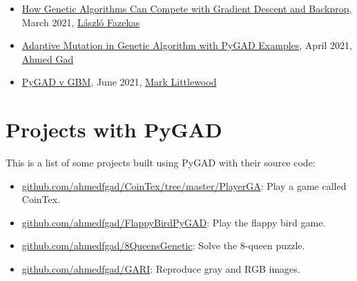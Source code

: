 \documentclass[conference]{IEEEtran}
\begin{document}
\begin{appendices}
\begin{itemize}
    \item \href{https://hackernoon.com/how-genetic-algorithms-can-compete-with-gradient-descent-and-backprop-9m9t33bq}{How Genetic Algorithms Can Compete with Gradient Descent and Backprop}, March 2021, \href{https://www.linkedin.com/in/l\%C3\%A1szl\%C3\%B3-fazekas-2429a912}{László Fazekas}
    \item \href{https://neptune.ai/blog/adaptive-mutation-in-genetic-algorithm-with-python-examples}{Adaptive Mutation in Genetic Algorithm with PyGAD Examples}, April 2021, \href{https://www.linkedin.com/in/ahmedfgad}{Ahmed Gad}
    \item \href{https://markatsmartersig.wordpress.com/2021/06/05/pygad-v-gbm}{PyGAD v GBM}, June 2021, \href{http://www.smartersig.com/mysportsai.php}{Mark Littlewood}
\end{itemize}

\section{Projects with PyGAD}
\label{AppendixB}

This is a list of some projects built using PyGAD with their source code:

\begin{itemize}
    \item \href{https://github.com/ahmedfgad/CoinTex/tree/master/PlayerGA}{github.com/ahmedfgad/CoinTex/tree/master/PlayerGA}: Play a game called CoinTex.
    \item \href{https://github.com/ahmedfgad/FlappyBirdPyGAD}{github.com/ahmedfgad/FlappyBirdPyGAD}: Play the flappy bird game.
    \item \href{https://github.com/ahmedfgad/8QueensGenetic}{github.com/ahmedfgad/8QueensGenetic}: Solve the 8-queen puzzle.
    \item \href{https://github.com/ahmedfgad/GARI}{github.com/ahmedfgad/GARI}: Reproduce gray and RGB images. 
\end{itemize}

\end{appendices}

\end{document}
